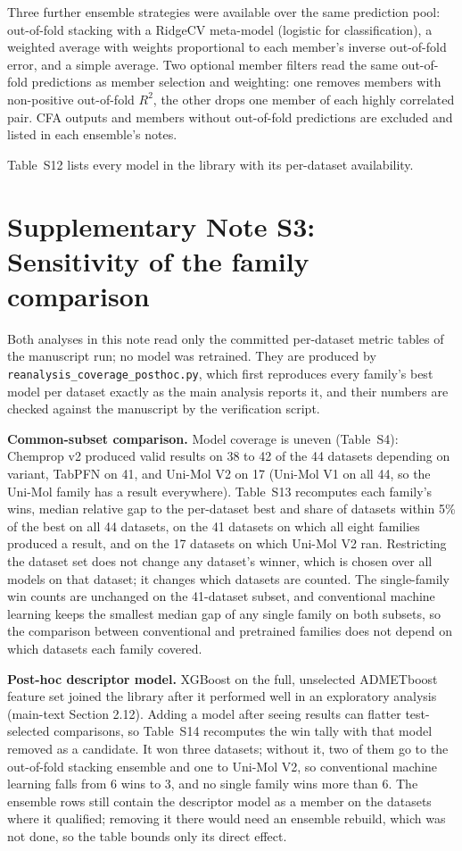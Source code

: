 \documentclass[11pt,a4paper]{article}
\begin{document}
Three further ensemble strategies were available over the same prediction pool: out-of-fold stacking with a RidgeCV meta-model (logistic for classification), a weighted average with weights proportional to each member's inverse out-of-fold error, and a simple average. Two optional member filters read the same out-of-fold predictions as member selection and weighting: one removes members with non-positive out-of-fold $R^2$, the other drops one member of each highly correlated pair. CFA outputs and members without out-of-fold predictions are excluded and listed in each ensemble's notes.

Table~S12 lists every model in the library with its per-dataset availability.



\clearpage
\section*{Supplementary Note S3: Sensitivity of the family comparison}\label{note:sensitivity}

Both analyses in this note read only the committed per-dataset metric tables of the manuscript run; no model was
retrained. They are produced by \texttt{reanalysis\_coverage\_posthoc.py}, which first reproduces every family's
best model per dataset exactly as the main analysis reports it, and their numbers are checked against the manuscript
by the verification script.

\textbf{Common-subset comparison.} Model coverage is uneven (Table~S4): Chemprop v2 produced valid results on 38 to 42
of the 44 datasets depending on variant, TabPFN on 41, and Uni-Mol V2 on 17 (Uni-Mol V1 on all 44, so the Uni-Mol
family has a result everywhere). Table~S13 recomputes each family's wins, median relative gap to the per-dataset best
and share of datasets within 5\% of the best on all 44 datasets, on the 41 datasets on which all eight families
produced a result, and on the 17 datasets on which Uni-Mol V2 ran. Restricting the dataset set does not change any
dataset's winner, which is chosen over all models on that dataset; it changes which datasets are counted. The
single-family win counts are unchanged on the 41-dataset subset, and conventional machine learning keeps the smallest
median gap of any single family on both subsets, so the comparison between conventional and pretrained families does
not depend on which datasets each family covered.

\textbf{Post-hoc descriptor model.} XGBoost on the full, unselected ADMETboost feature set joined the library after it
performed well in an exploratory analysis (main-text Section 2.12). Adding a model after seeing results can flatter
test-selected comparisons, so Table~S14 recomputes the win tally with that model removed as a candidate. It won three
datasets; without it, two of them go to the out-of-fold stacking ensemble and one to Uni-Mol V2, so conventional
machine learning falls from 6 wins to 3, and no single family wins more than 6. The ensemble rows still contain the
descriptor model as a member on the datasets where it qualified; removing it there would need an ensemble rebuild,
which was not done, so the table bounds only its direct effect.
\end{document}

